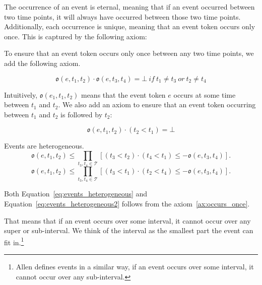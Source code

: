 The occurrence of an event is eternal, meaning that if an event occurred between two time points, it will always have occurred between those two time points. Additionally, each occurrence is unique, meaning that an event token occurs only once. This is captured by the following axiom:

To ensure that an event token occurs only once between any two time points, we add the following axiom.

\begin{axiom}
    \begin{equation}
        \mathfrak{o}(e, t_1, t_2) \cdot \mathfrak{o}(e, t_3, t_4) = \bot  \ if \ t_1 \neq t_3 \ or \  t_2 \neq t_4
    \end{equation}
    \label{ax:occurs_once}
\end{axiom}

Intuitively, $\mathfrak{o}(e_1, t_1, t_2)$ means that the event token $e$ occurs at some time between $t_1$ and $t_2$. We also add an axiom to ensure that an event token occurring between $t_1$ and $t_2$ is followed by $t_2$:

\begin{axiom}
    \begin{equation}
        \mathfrak{o}(e, t_1, t_2) \cdot (t_2 < t_1) = \bot
    \end{equation}
\end{axiom}

\begin{theorem} Events are heterogeneous.
    \begin{equation}
        \mathfrak{o}(e, t_1, t_2) \leq \prod_{t_3, t_4 \in \mathcal{T}} [(t_3 < t_2) \cdot (t_4 < t_1)
            \leq - \mathfrak{o}(e, t_3, t_4)].
        \label{eq:events_heterogeneous}
    \end{equation}
    \begin{equation}
        \mathfrak{o}(e, t_1, t_2) \leq \prod_{t_3, t_4 \in \mathcal{T}} [(t_3 < t_1) \cdot (t_2 < t_4)
            \leq - \mathfrak{o}(e, t_3, t_4)].
        \label{eq:events_heterogeneous2}
    \end{equation}
\end{theorem}

Both Equation~\ref{eq:events_heterogeneous} and Equation~\ref{eq:events_heterogeneous2} follows from the 
axiom~\ref{ax:occurs_once}.

That means that if an event occurs over some interval, it cannot occur over any super or sub-interval.
We think of the interval as the smallest part the event can fit in.\footnote{Allen \cite{allen1984towards} defines events in a similar way, if an event occurs over some interval, it cannot occur over any sub-interval.
}

